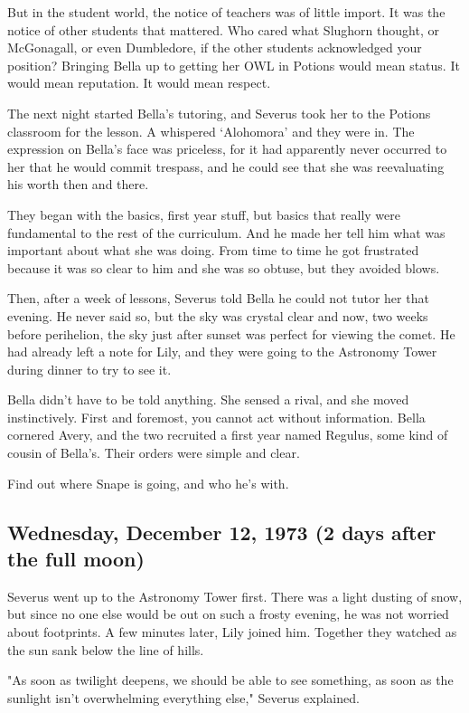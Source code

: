 But in the student world, the notice of teachers was of little import. It was the notice of other students that mattered. Who cared what Slughorn thought, or McGonagall, or even Dumbledore, if the other students acknowledged your position? Bringing Bella up to getting her OWL in Potions would mean status. It would mean reputation. It would mean respect.

The next night started Bella's tutoring, and Severus took her to the Potions classroom for the lesson. A whispered `Alohomora' and they were in. The expression on Bella's face was priceless, for it had apparently never occurred to her that he would commit trespass, and he could see that she was reevaluating his worth then and there.

They began with the basics, first year stuff, but basics that really were fundamental to the rest of the curriculum. And he made her tell him what was important about what she was doing. From time to time he got frustrated because it was so clear to him and she was so obtuse, but they avoided blows.

Then, after a week of lessons, Severus told Bella he could not tutor her that evening. He never said so, but the sky was crystal clear and now, two weeks before perihelion, the sky just after sunset was perfect for viewing the comet. He had already left a note for Lily, and they were going to the Astronomy Tower during dinner to try to see it.

Bella didn't have to be told anything. She sensed a rival, and she moved instinctively. First and foremost, you cannot act without information. Bella cornered Avery, and the two recruited a first year named Regulus, some kind of cousin of Bella's. Their orders were simple and clear.

Find out where Snape is going, and who he's with.

\subsection{Wednesday, December 12, 1973 (2 days after the full moon)}

Severus went up to the Astronomy Tower first. There was a light dusting of snow, but since no one else would be out on such a frosty evening, he was not worried about footprints. A few minutes later, Lily joined him. Together they watched as the sun sank below the line of hills.

"As soon as twilight deepens, we should be able to see something, as soon as the sunlight isn't overwhelming everything else," Severus explained.

